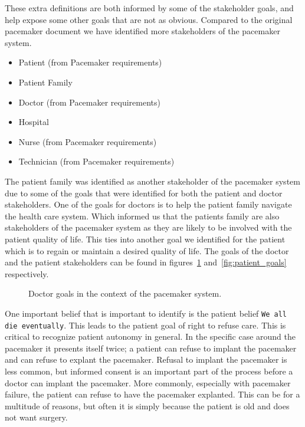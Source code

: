These extra definitions are both informed by some of the stakeholder goals, and help expose some other goals that are not as obvious. Compared to the original pacemaker document we have identified more stakeholders of the pacemaker system. 

\begin{itemize}
	\item Patient (from Pacemaker requirements)
	\item Patient Family
	\item Doctor (from Pacemaker requirements)
	\item Hospital
	\item Nurse (from Pacemaker requirements)
	\item Technician (from Pacemaker requirements)
\end{itemize}

The patient family was identified as another stakeholder of the pacemaker system due to some of the goals that were identified for both the patient and doctor stakeholders. One of the goals for doctors is to help the patient family navigate the health care system. Which informed us that the patients family are also stakeholders of the pacemaker system as they are likely to be involved with the patient quality of life. This ties into another goal we identified for the patient which is to regain or maintain a desired quality of life. The goals of the doctor and the patient stakeholders can be found in figures~\ref{fig:doctor_goals} and~\ref{fig:patient_goals} respectively.

\begin{figure}
	\centering
	
	\caption{Doctor goals in the context of the pacemaker system.}
	\label{fig:doctor_goals}
\end{figure}

One important belief that is important to identify is the patient belief \texttt{We all die eventually}. This leads to the patient goal of right to refuse care. This is critical to recognize patient autonomy in general. In the specific case around the pacemaker it presents itself twice; a patient can refuse to implant the pacemaker and can refuse to explant the pacemaker. Refusal to implant the pacemaker is less common, but informed consent is an important part of the process before a doctor can implant the pacemaker. More commonly, especially with pacemaker failure, the patient can refuse to have the pacemaker explanted. This can be for a multitude of reasons, but often it is simply because the patient is old and does not want surgery.

